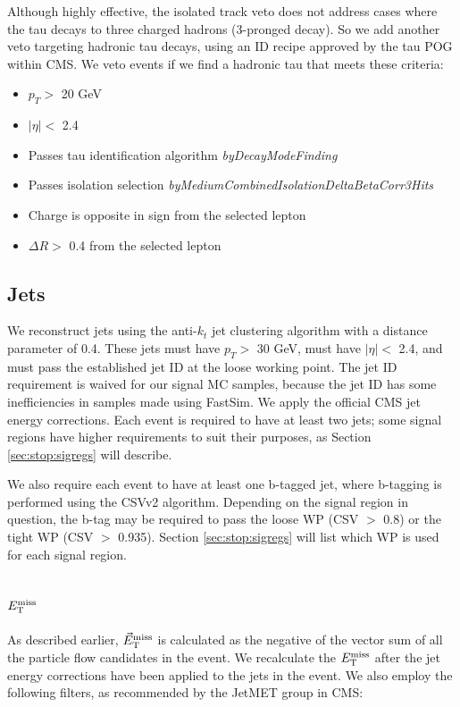 Although highly effective, the isolated track veto does not address
cases where the tau decays to three charged hadrons (3-pronged
decay). So we add another veto targeting hadronic tau decays, using an
ID recipe approved by the tau POG within CMS. We veto events if we
find a hadronic tau that meets these criteria:

\begin{itemize}
\item $p_T >$ 20 GeV
\item $|\eta| <$ 2.4
\item Passes tau identification algorithm \emph{byDecayModeFinding}
\item Passes isolation selection
  \emph{byMediumCombinedIsolationDeltaBetaCorr3Hits}
\item Charge is opposite in sign from the selected lepton
\item $\Delta R >$ 0.4 from the selected lepton
\end{itemize}

\subsection{Jets}
\label{ssec:stop:jets}

We reconstruct jets using the anti-$k_t$ jet clustering algorithm
\cite{antikt} with a distance parameter of 0.4. These jets must have
$p_T >$ 30 GeV, must have $|\eta| <$ 2.4, and must pass the
established jet ID at the loose working point. The jet ID requirement
is waived for our signal MC samples, because the jet ID has some
inefficiencies in samples made using FastSim. We apply the official
CMS jet energy corrections. Each event is required to have at least
two jets; some signal regions have higher requirements to
suit their purposes, as Section \ref{sec:stop:sigregs} will describe.

We also require each event to have at least one b-tagged jet, where
b-tagging is performed using the CSVv2 algorithm. Depending on the
signal region in question, the b-tag may be required to pass the loose
WP (CSV $>$ 0.8) or the tight WP (CSV $>$ 0.935). Section
\ref{sec:stop:sigregs} will list which WP is used for each signal region.

\subsection{\texorpdfstring{$E_\text{T}^\text{miss}$}{MET}}
\label{ssec:stop:met}

As described earlier, $\vec{E}_\text{T}^\text{miss}$ is calculated as the negative of the vector
sum of all the particle flow candidates in the event. We recalculate
the $E_\text{T}^\text{miss}$ after the jet energy corrections have been applied to the jets
in the event. We also employ the following filters, as recommended by
the JetMET group in CMS:

